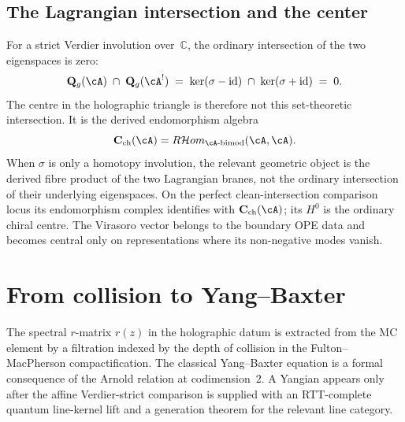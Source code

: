 \subsection{The Lagrangian intersection and the center}
\label{subsec:thqg-intro-lagrangian-intersection}

For a strict Verdier involution over~$\mathbb{C}$, the ordinary
intersection of the two eigenspaces is zero:
\begin{equation}\label{eq:thqg-intro-lagrangian-intersection}
\mathbf{Q}_g(\cA) \;\cap\; \mathbf{Q}_g(\cA^!)
\;=\;
\ker(\sigma - \operatorname{id}) \;\cap\; \ker(\sigma + \operatorname{id})
\;=\;
0.
\end{equation}
The centre in the holographic triangle is therefore not this
set-theoretic intersection. It is the derived endomorphism algebra
\[
\mathbf{C}_{\mathrm{ch}}(\cA)
=
R\mathcal{H}om_{\cA\text{-bimod}}(\cA,\cA).
\]
When $\sigma$ is only a homotopy involution, the relevant geometric
object is the derived fibre product of the two Lagrangian branes, not
the ordinary intersection of their underlying eigenspaces. On the
perfect clean-intersection comparison locus its endomorphism complex
identifies with $\mathbf{C}_{\mathrm{ch}}(\cA)$; its $H^0$ is the
ordinary chiral centre. The Virasoro vector belongs to the boundary
OPE data and becomes central only on representations where its
non-negative modes vanish.



\section{From collision to Yang--Baxter}
\label{sec:thqg-intro-collision-yang-baxter}

The spectral $r$-matrix $r(z)$ in the holographic datum is extracted
from the MC element by a filtration indexed by the depth of collision
in the Fulton--MacPherson compactification. The classical Yang--Baxter
equation is a formal consequence of the Arnold relation at
codimension~$2$. A Yangian appears only after the affine
Verdier-strict comparison is supplied with an RTT-complete quantum
line-kernel lift and a generation theorem for the relevant line
category.

